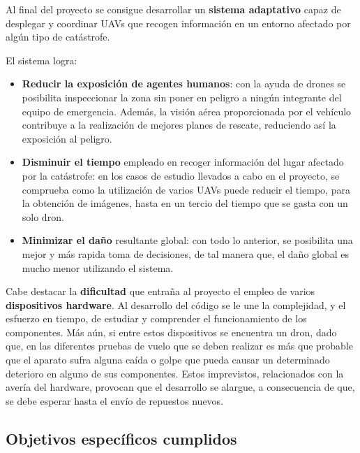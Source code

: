 Al final del proyecto se consigue desarrollar un \textbf{sistema adaptativo} capaz de desplegar y coordinar \acs{UAV}s que recogen información en un entorno afectado por algún tipo de catástrofe. 

El sistema logra:

\begin{itemize}
\item \textbf{Reducir la exposición de agentes humanos}: con la ayuda de drones se posibilita inspeccionar la zona sin poner en peligro a ningún integrante del equipo de emergencia. Además, la visión aérea proporcionada por el vehículo contribuye a la realización de mejores planes de rescate, reduciendo así la exposición al peligro. 
\item \textbf{Disminuir el tiempo} empleado en recoger información del lugar afectado por la catástrofe: en los casos de estudio llevados a cabo en el proyecto, se comprueba como la utilización de varios \acs{UAV}s puede reducir el tiempo, para la obtención de imágenes, hasta en un tercio del tiempo que se gasta con un solo dron.
\item \textbf{Minimizar el daño} resultante global: con todo lo anterior, se posibilita una mejor y más rapida toma de decisiones, de tal manera que, el daño global es mucho menor utilizando el sistema.
\end{itemize}

Cabe destacar la \textbf{dificultad} que entraña al proyecto el empleo de varios \textbf{dispositivos hardware}. Al desarrollo del código se le une la complejidad, y el esfuerzo en tiempo, de estudiar y comprender el funcionamiento de los componentes. Más aún, si entre estos dispositivos se encuentra un dron, dado que, en las diferentes pruebas de vuelo que se deben realizar es más que probable que el aparato sufra alguna caída o golpe que pueda causar un determinado deterioro en alguno de sus componentes. Estos imprevistos, relacionados con la avería del hardware, provocan que el desarrollo se alargue, a consecuencia de que, se debe esperar hasta el envío de repuestos nuevos.

\subsection{Objetivos específicos cumplidos}

